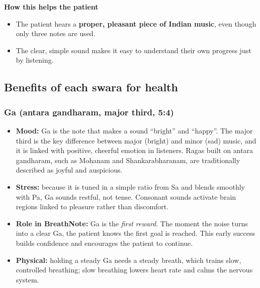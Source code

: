 \documentclass[12pt,a4paper]{article}
\begin{document}
\textbf{How this helps the patient}
\begin{itemize}
  \item The patient hears a \textbf{proper, pleasant piece of Indian music}, even though only three notes are used.
  \item The clear, simple sound makes it easy to understand their own progress just by listening.
\end{itemize}

\subsection{Benefits of each swara for health}
\label{sec:benefits}

\subsubsection{Ga (antara gandharam, major third, 5:4)}
\begin{itemize}
  \item \textbf{Mood:} Ga is the note that makes a sound ``bright'' and ``happy''. The major third is the key difference between major (bright) and minor (sad) music, and it is linked with positive, cheerful emotion in listeners. Ragas built on antara gandharam, such as Mohanam and Shankarabharanam, are traditionally described as joyful and auspicious.
  \item \textbf{Stress:} because it is tuned in a simple ratio from Sa and blends smoothly with Pa, Ga sounds restful, not tense. Consonant sounds activate brain regions linked to pleasure rather than discomfort.
  \item \textbf{Role in BreathNote:} Ga is the \emph{first reward}. The moment the noise turns into a clear Ga, the patient knows the first goal is reached. This early success builds confidence and encourages the patient to continue.
  \item \textbf{Physical:} holding a steady Ga needs a steady breath, which trains slow, controlled breathing; slow breathing lowers heart rate and calms the nervous system.
\end{itemize}
\end{document}
